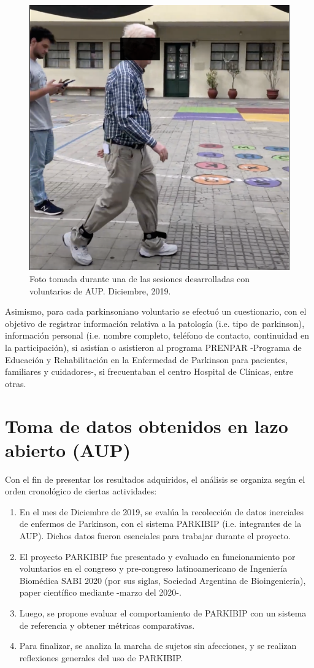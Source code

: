\begin{figure}[h!]
\centering
\includegraphics[clip,width=0.6 \columnwidth]{TESIS/imagenes/chap06/aup-session-image.png}
\caption{Foto tomada durante una de las sesiones desarrolladas con voluntarios de AUP. Diciembre, 2019.}
\label{fig:real-session-aup}
\end{figure}

Asimismo, para cada parkinsoniano voluntario se efectuó un cuestionario, con el objetivo de registrar información relativa a la patología (i.e. tipo de parkinson), información personal (i.e. nombre completo,  teléfono de contacto, continuidad en la participación), si asistían o asistieron al programa PRENPAR -Programa de Educación y Rehabilitación en la Enfermedad de Parkinson para pacientes, familiares y cuidadores-, si frecuentaban el centro Hospital de Clínicas, entre otras.

\newpage

\section{Toma de datos obtenidos en lazo abierto (AUP)}

Con el fin de presentar los resultados adquiridos, el análisis se organiza según el orden cronológico de ciertas actividades:
\begin{enumerate}
    \item En el mes de Diciembre de 2019, se evalúa la recolección de datos inerciales de enfermos de Parkinson, con el sistema PARKIBIP (i.e. integrantes  de la AUP). Dichos datos fueron esenciales para trabajar durante el proyecto.
    \item El proyecto PARKIBIP fue presentado y evaluado en funcionamiento por voluntarios en el congreso y pre-congreso latinoamericano de Ingeniería Biomédica SABI 2020 (por sus siglas, Sociedad Argentina de Bioingeniería), paper científico mediante -marzo del 2020-.
    \item Luego, se propone evaluar el comportamiento de PARKIBIP con un sistema de referencia y obtener métricas comparativas.
    \item Para finalizar, se analiza la marcha de sujetos sin afecciones, y se realizan reflexiones generales del uso de PARKIBIP.
\end{enumerate}

